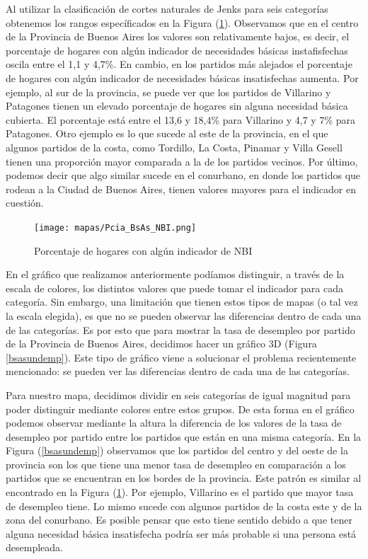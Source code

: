 \documentclass[12pt]{article}
\begin{document}
Al utilizar la clasificación de cortes naturales de Jenks para seis categorías obtenemos los rangos específicados en la Figura (\ref{bsasnbi}). Observamos que en el centro de la Provincia de Buenos Aires los valores son relativamente bajos, es decir, el porcentaje de hogares con alg\'un indicador de necesidades b\'asicas instafisfechas oscila entre el 1,1 y 4,7\%. En cambio, en los partidos más alejados el porcentaje de hogares con algún indicador de necesidades básicas insatisfechas aumenta. Por ejemplo, al sur de la provincia, se puede ver que los partidos de Villarino y Patagones tienen un elevado porcentaje de hogares sin alguna necesidad b\'asica cubierta. El porcentaje est\'a entre el 13,6 y 18,4\% para Villarino y 4,7 y 7\% para Patagones. Otro ejemplo es lo que sucede al este de la provincia, en el que algunos partidos de la costa, como Tordillo, La Costa, Pinamar y Villa Gesell tienen una proporci\'on mayor comparada a la de los partidos vecinos. Por \'ultimo, podemos decir que algo similar sucede en el conurbano, en donde los partidos que rodean a la Ciudad de Buenos Aires, tienen valores mayores para el indicador en cuesti\'on.

\begin{figure}
    \centering
    \texttt{[image: mapas/Pcia\_BsAs\_NBI.png]}   
    \caption{Porcentaje de hogares con algún indicador de NBI}
    \label{bsasnbi}
\end{figure}

En el gr\'afico que realizamos anteriormente pod\'iamos distinguir, a trav\'es de la escala de colores, los distintos valores que puede tomar el indicador para cada categor\'ia. Sin embargo, una limitaci\'on que tienen estos tipos de mapas (o tal vez la escala elegida), es que no se pueden observar las diferencias dentro de cada una de las categor\'ias. Es por esto que para mostrar la tasa de desempleo  por partido de la Provincia de Buenos Aires, decidimos hacer un gr\'afico 3D (Figura \ref{bsasundemp}). Este tipo de gr\'afico viene a solucionar el problema recientemente mencionado: se pueden ver las diferencias dentro de cada una de las categor\'ias.

Para nuestro mapa, decidimos dividir en seis categorías de igual magnitud para poder distinguir mediante colores entre estos grupos. De esta forma en el gráfico podemos observar mediante la altura la diferencia de los valores de la tasa de desempleo por partido entre los partidos que están en una misma categoría. En la Figura (\ref{bsasundemp}) observamos que los partidos del centro y del oeste de la provincia son los que tiene una menor tasa de desempleo en comparación a los partidos que se encuentran en los bordes de la provincia. Este patrón es similar al encontrado en la Figura (\ref{bsasnbi}). Por ejemplo, Villarino es el partido que mayor tasa de desempleo tiene. Lo mismo sucede con algunos partidos de la costa este y de la zona del conurbano. Es posible pensar que esto tiene sentido debido a que tener alguna necesidad básica insatisfecha podría ser más probable si una persona está desempleada. 
\end{document}
